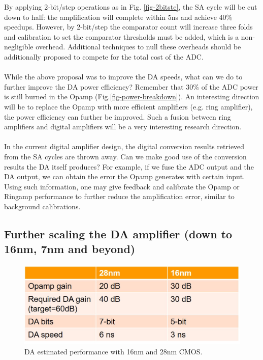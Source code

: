 By applying 2-bit/step operations as in Fig. \ref{fig-2bitste}, the SA cycle will be cut down to half: the amplification will complete within 5ns and achieve 40\% speedups.
However, by 2-bit/step the comparator count will increase three folds and calibration to set the comparator thresholds must be added, which is a non-negligible overhead. Additional techniques to null these overheads should be additionally proposed to compete for the total cost of the ADC.
\\
\\
While the above proposal was to improve the DA speeds, what can we do to further improve the DA power efficiency?
Remember that 30\% of the ADC power is still burned in the Opamp (Fig.\ref{fig-power-breakdown}).
An interesting direction will be to replace the Opamp with more efficient amplifiers (e.g. ring amplifier), the power efficiency can further be improved.
Such a fusion between ring amplifiers and digital amplifiers will be a very interesting research direction.
\\
\\
In the current digital amplifier design, the digital conversion results retrieved from the SA cycles are thrown away. Can we make good use of the conversion results the DA itself produces?
For example, if we fuse the ADC output and the DA output, we can obtain the error the Opamp generates with certain input.
Using such information, one may give feedback and calibrate the Opamp or Ringamp performance to further reduce the amplification error, similar to background calibrations.

\subsection{Further scaling the DA amplifier (down to 16nm, 7nm and beyond)}
\begin{figure}
\centering
  \includegraphics[width=1\textwidth]{figure/chap5/da-perf.jpg}
  \caption{DA estimated performance with 16nm and 28nm CMOS.}
  \label{fig-16nm}
\end{figure}


